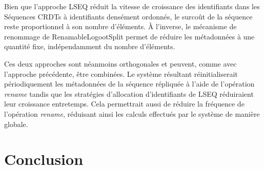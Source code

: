 \documentclass[12pt]{thesul}
\begin{document}
Bien que l'approche LSEQ réduit la vitesse de croissance des identifiants dans les Séquences \acp{CRDT} à identifiants densément ordonnés, le surcoût de la séquence reste proportionnel à son nombre d'éléments.
À l'inverse, le mécanisme de renommage de RenamableLogootSplit permet de réduire les métadonnées à une quantité fixe, indépendamment du nombre d'éléments.

Ces deux approches sont néanmoins orthogonales et peuvent, comme avec l'approche précédente, être combinées.
Le système résultant réinitialiserait périodiquement les métadonnées de la séquence répliquée à l'aide de l'opération \emph{rename} tandis que les stratégies d'allocation d'identifiants de LSEQ réduiraient leur croissance entretemps.
Cela permettrait aussi de réduire la fréquence de l'opération \emph{rename}, réduisant ainsi les calculs effectués par le système de manière globale.





\section{Conclusion}
\end{document}
